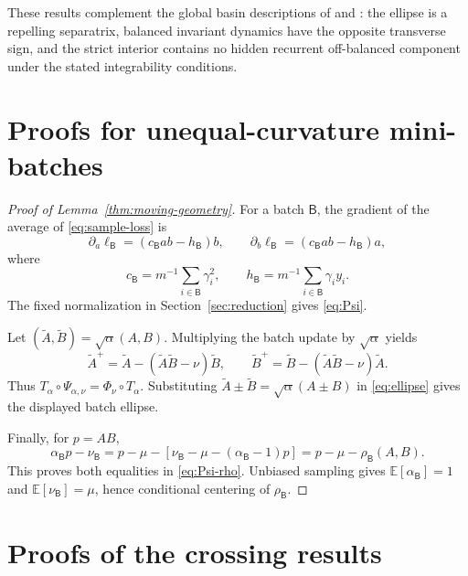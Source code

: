 \documentclass[11pt]{article}
\newcommand{\E}{\mathbb E}
\begin{document}
These results complement the global basin descriptions of
\citet{liang2026gradient} and \citet{moon2026state}: the ellipse is a
repelling separatrix, balanced invariant dynamics have the opposite
transverse sign, and the strict interior contains no hidden recurrent
off-balanced component under the stated integrability conditions.

\section{Proofs for unequal-curvature mini-batches}
\label{app:minibatch-proofs}

\begin{proof}[Proof of Lemma~\ref{thm:moving-geometry}]
For a batch \(\mathsf B\), the gradient of the average of
\eqref{eq:sample-loss} is
\[
\partial_a\ell_{\mathsf B}
=(c_{\mathsf B}ab-h_{\mathsf B})b,
\qquad
\partial_b\ell_{\mathsf B}
=(c_{\mathsf B}ab-h_{\mathsf B})a,
\]
where
\[
c_{\mathsf B}=m^{-1}\sum_{i\in\mathsf B}\gamma_i^2,
\qquad
h_{\mathsf B}=m^{-1}\sum_{i\in\mathsf B}\gamma_i y_i.
\]
The fixed normalization in Section~\ref{sec:reduction} gives
\eqref{eq:Psi}.

Let \((\widetilde A,\widetilde B)=\sqrt\alpha(A,B)\).  Multiplying the
batch update by \(\sqrt\alpha\) yields
\[
\widetilde A^+
=\widetilde A-(\widetilde A\widetilde B-\nu)\widetilde B,
\qquad
\widetilde B^+
=\widetilde B-(\widetilde A\widetilde B-\nu)\widetilde A.
\]
Thus \(T_\alpha\circ\Psi_{\alpha,\nu}
=\Phi_\nu\circ T_\alpha\).  Substituting
\(\widetilde A\pm\widetilde B=\sqrt\alpha(A\pm B)\) in
\eqref{eq:ellipse} gives the displayed batch ellipse.

Finally, for \(p=AB\),
\[
\alpha_{\mathsf B}p-\nu_{\mathsf B}
=p-\mu-\left[
\nu_{\mathsf B}-\mu-(\alpha_{\mathsf B}-1)p
\right]
=p-\mu-\rho_{\mathsf B}(A,B).
\]
This proves both equalities in \eqref{eq:Psi-rho}.  Unbiased sampling gives
\(\E[\alpha_{\mathsf B}]=1\) and
\(\E[\nu_{\mathsf B}]=\mu\), hence conditional centering of \(\rho_{\mathsf
B}\).
\end{proof}

\section{Proofs of the crossing results}
\label{app:crossing-proofs}
\end{document}
